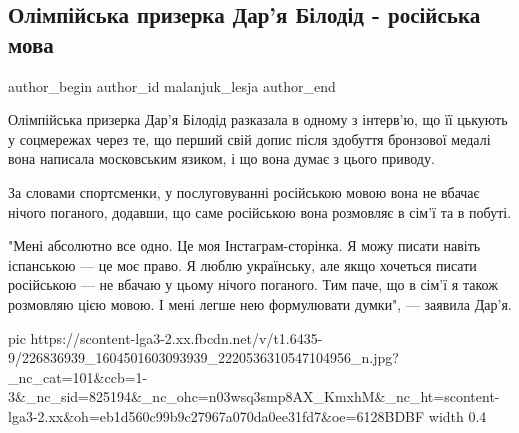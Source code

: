  
 
 
 
 
 
\subsection{Олімпійська призерка Дар'я Білодід - російська мова}
\label{sec:29_07_2021.fb.malanjuk_lesja.1.bilodid_darja_jazyk_semja}
 
\ifcmt
 author_begin
   author_id malanjuk_lesja
 author_end
\fi

Олімпійська призерка Дар'я Білодід разказала в одному з інтерв'ю, що її цькують
у соцмережах через те, що перший свій допис після здобуття бронзової медалі
вона написала московським язиком, і що вона думає з цього приводу. 

За словами спортсменки, у послуговуванні російською мовою вона не вбачає нічого
поганого, додавши, що саме російською вона розмовляє в сім'ї та в побуті. 

"Мені абсолютно все одно. Це моя Інстаграм-сторінка. Я можу писати навіть
іспанською — це моє право. Я люблю українську, але якщо хочеться писати
російською — не вбачаю у цьому нічого поганого. Тим паче, що в сім'ї я також
розмовляю цією мовою. І мені легше нею формулювати думки", — заявила Дар'я.

\ifcmt
  pic https://scontent-lga3-2.xx.fbcdn.net/v/t1.6435-9/226836939_1604501603093939_2220536310547104956_n.jpg?_nc_cat=101&ccb=1-3&_nc_sid=825194&_nc_ohc=n03wsq3smp8AX_KmxhM&_nc_ht=scontent-lga3-2.xx&oh=eb1d560c99b9c27967a070da0ee31fd7&oe=6128BDBF
  width 0.4
\fi

